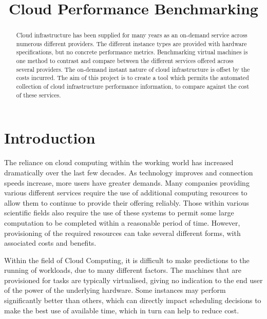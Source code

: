 \documentclass[conference]{IEEEtran}
\begin{document}
\title{Cloud Performance Benchmarking}
\author{
  }
\maketitle


\begin{abstract}
Cloud infrastructure has been supplied for many years as an on-demand service across numerous different providers. The different instance types are provided with hardware specifications, but no concrete performance metrics. Benchmarking virtual machines is one method to contrast and compare between the different services offered across several providers. The on-demand instant nature of cloud infrastructure is offset by the costs incurred. The aim of this project is to create a tool which permits the automated collection of cloud infrastructure performance information, to compare against the cost of these services.
\end{abstract}



\section{Introduction}\label{sec:introduction}

The reliance on cloud computing within the working world has increased dramatically over the last few decades. As technology improves and connection speeds increase, more users have greater demands. Many companies providing various different services require the use of additional computing resources to allow them to continue to provide their offering reliably. Those within various scientific fields also require the use of these systems to permit some large computation to be completed within a reasonable period of time. However, provisioning of the required resources can take several different forms, with associated costs and benefits.

Within the field of Cloud Computing, it is difficult to make predictions to the running of workloads, due to many different factors. The machines that are provisioned for tasks are typically virtualised, giving no indication to the end user of the power of the underlying hardware. Some instances may perform significantly better than others, which can directly impact scheduling decisions to make the best use of available time, which in turn can help to reduce cost.
\end{document}

